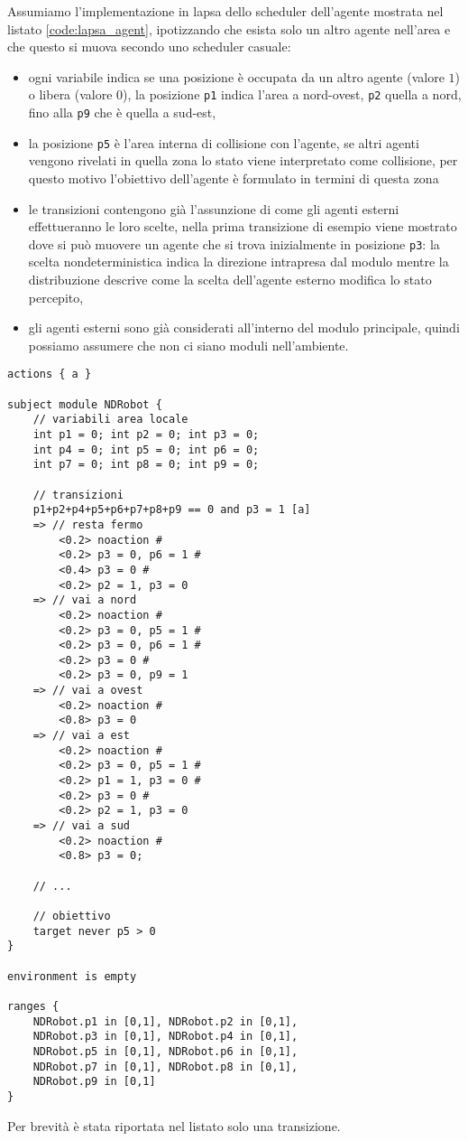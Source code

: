 Assumiamo l'implementazione in \ac{lapsa} dello scheduler dell'agente mostrata nel listato \ref{code:lapsa_agent}, ipotizzando che esista solo un altro agente nell'area e che questo si muova secondo uno scheduler casuale:
\begin{itemize}
	\item ogni variabile indica se una posizione è occupata da un altro agente (valore $1$) o libera (valore $0$), la posizione \texttt{p1} indica l'area a nord-ovest, \texttt{p2} quella a nord, fino alla \texttt{p9} che è quella a sud-est,
	\item la posizione \texttt{p5} è l'area interna di collisione con l'agente, se altri agenti vengono rivelati in quella zona lo stato viene interpretato come collisione, per questo motivo l'obiettivo dell'agente è formulato in termini di questa zona
	\item le transizioni contengono già l'assunzione di come gli agenti esterni effettueranno le loro scelte, nella prima transizione di esempio viene mostrato dove si può muovere un agente che si trova inizialmente in posizione \texttt{p3}: la scelta nondeterministica indica la direzione intrapresa dal modulo mentre la distribuzione descrive come la scelta dell'agente esterno modifica lo stato percepito,
	\item gli agenti esterni sono già considerati all'interno del modulo principale, quindi possiamo assumere che non ci siano moduli nell'ambiente.
\end{itemize}
\begin{lstlisting}[language=lapsa,style=eclipse,caption={Implementazione \acs{lapsa} dello scheduler basato su model checking},label=code:lapsa_agent]
actions { a }

subject module NDRobot {
	// variabili area locale
	int p1 = 0; int p2 = 0; int p3 = 0;
	int p4 = 0; int p5 = 0; int p6 = 0;
	int p7 = 0; int p8 = 0; int p9 = 0;
	
	// transizioni
	p1+p2+p4+p5+p6+p7+p8+p9 == 0 and p3 = 1 [a]
	=> // resta fermo
		<0.2> noaction #
		<0.2> p3 = 0, p6 = 1 #
		<0.4> p3 = 0 #
		<0.2> p2 = 1, p3 = 0
	=> // vai a nord
		<0.2> noaction #
		<0.2> p3 = 0, p5 = 1 #
		<0.2> p3 = 0, p6 = 1 #
		<0.2> p3 = 0 #
		<0.2> p3 = 0, p9 = 1
	=> // vai a ovest
		<0.2> noaction #
		<0.8> p3 = 0
	=> // vai a est
		<0.2> noaction #
		<0.2> p3 = 0, p5 = 1 #
		<0.2> p1 = 1, p3 = 0 #
		<0.2> p3 = 0 #
		<0.2> p2 = 1, p3 = 0
	=> // vai a sud
		<0.2> noaction #
		<0.8> p3 = 0;

	// ...
	
	// obiettivo
	target never p5 > 0
}

environment is empty

ranges {
	NDRobot.p1 in [0,1], NDRobot.p2 in [0,1],
	NDRobot.p3 in [0,1], NDRobot.p4 in [0,1],
	NDRobot.p5 in [0,1], NDRobot.p6 in [0,1],
	NDRobot.p7 in [0,1], NDRobot.p8 in [0,1],
	NDRobot.p9 in [0,1]
}
\end{lstlisting}
Per brevità è stata riportata nel listato solo una transizione. 

